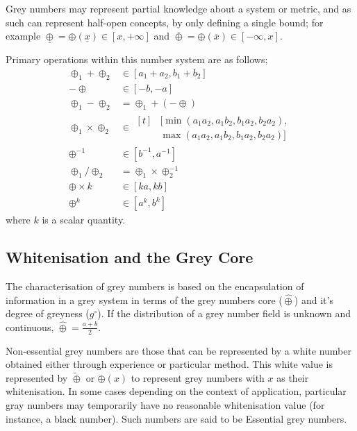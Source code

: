 Grey numbers may represent partial knowledge about a system or metric, and as such can represent half-open concepts, by only defining a single bound; for example $\underline\oplus = \oplus(\underline x ) \in [x, +\infty]$ and $\overline\oplus = \oplus(\overline x) \in [-\infty, x]$.

Primary operations within this number system are as follows;
\begin{subequations}
  \begin{align}
    \oplus_1 + \oplus_2      &\in [a_1+a_2,b_1+b_2] \label{eq:grey_add}\\
    -\oplus         &\in [-b,-a] \label{eq:grey_neg} \\
    \oplus_1 - \oplus_2      &= \oplus_1+(-\oplus) \label{eq:grey_sub}\\
    \oplus_1 \times \oplus_2 &\in \begin{aligned}[t]
      &[\min(a_1 a_2, a_1 b_2, b_1 a_2, b_2 a_2), \\
      & \max(a_1 a_2, a_1 b_2, b_1 a_2, b_2 a_2)]
    \end{aligned} \label{eq:grey_mult}\\
    \oplus^{-1} &\in [b^{-1}, a^{-1}] \label{eq:grey_inv}\\
    \oplus_1 / \oplus_2 & = \oplus_1 \times \oplus_2^{-1} \label{eq:grey_div} \\
    \oplus \times k &\in [ka,kb] \label{eq:grey_times_scalar}\\
    \oplus^k &\in [a^k, b^k] \label{eq:grey_exp}
  \end{align}
\end{subequations}
where $k$ is a scalar quantity.

\subsection{Whitenisation and the Grey Core}
The characterisation of grey numbers is based on the encapsulation of information in a grey system in terms of the grey numbers core ($\hat\oplus$) and it's degree of greyness ($g^\circ$).
If the distribution of a grey number field is unknown and continuous, $\hat\oplus = \frac{a + b}{2}$.

Non-essential grey numbers are those that can be represented by a white number obtained either through experience or particular method. \cite{Liu2011}
This white value is represented by $\tilde\oplus$ or $\oplus(x)$ to represent grey numbers with $x$ as their whitenisation.
In some cases depending on the context of application, particular gray numbers may temporarily have no reasonable whitenisation value (for instance, a black number).
Such numbers are said to be Essential grey numbers.

